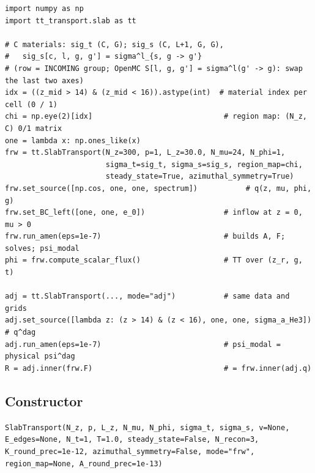 \documentclass[11pt,a4paper]{article}
\newcommand{\code}[1]{\texttt{#1}}
\begin{document}
\begin{lstlisting}
import numpy as np
import tt_transport.slab as tt

# C materials: sig_t (C, G); sig_s (C, L+1, G, G),
#   sig_s[c, l, g, g'] = sigma^l_{s, g -> g'}
# (row = INCOMING group; OpenMC S[l, g, g'] = sigma^l(g' -> g): swap the last two axes)
idx = ((z_mid > 14) & (z_mid < 16)).astype(int)  # material index per cell (0 / 1)
chi = np.eye(2)[idx]                              # region map: (N_z, C) 0/1 matrix
one = lambda x: np.ones_like(x)
frw = tt.SlabTransport(N_z=300, p=1, L_z=30.0, N_mu=24, N_phi=1,
                       sigma_t=sig_t, sigma_s=sig_s, region_map=chi,
                       steady_state=True, azimuthal_symmetry=True)
frw.set_source([np.cos, one, one, spectrum])           # q(z, mu, phi, g)
frw.set_BC_left([one, one, e_0])                  # inflow at z = 0, mu > 0
frw.run_amen(eps=1e-7)                            # builds A, F; solves; psi_modal
phi = frw.compute_scalar_flux()                   # TT over (z_r, g, t)

adj = tt.SlabTransport(..., mode="adj")           # same data and grids
adj.set_source([lambda z: (z > 14) & (z < 16), one, one, sigma_a_He3])   # q^dag
adj.run_amen(eps=1e-7)                            # psi_modal = physical psi^dag
R = adj.inner(frw.F)                              # = frw.inner(adj.q)
\end{lstlisting}

\subsection{Constructor}

\code{SlabTransport(N\_z, p, L\_z, N\_mu, N\_phi, sigma\_t, sigma\_s, v=None, E\_edges=None, N\_t=1, T=1.0, steady\_state=False, N\_recon=3, K\_round\_prec=1e-12, azimuthal\_symmetry=False, mode="frw", region\_map=None, A\_round\_prec=1e-13)}
\end{document}
